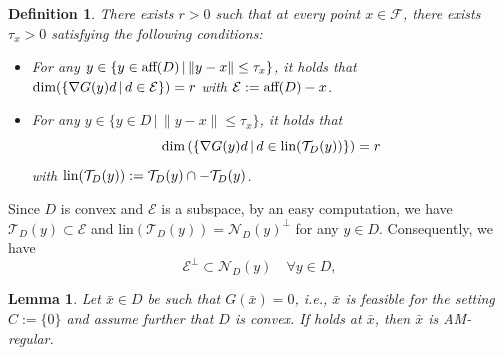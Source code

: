 \documentclass[10pt,a4paper]{amsart}
\newtheorem{definition}{Definition}
\newtheorem{lemma}{Lemma}
\begin{document}
\begin{definition}\label{Def:rCRCQ}
    There exists $r>0$ such that at every point $x\in \mathcal F$, there exists $\tau_x>0$ satisfying the following conditions:
    \begin{itemize}
        \item[(a)] For any $y\in \{y\in \text{\rm aff}(D) \,|\, \|y-x\|\leq \tau_x\}$, it holds that $\text{\rm dim}(\{\nabla G(y)d\,|\,d\in \mathcal E\})=r$ with $\mathcal E:=\text{\rm aff}(D)-x$.
        \item[(b)] For any $y\in \{y\in D \,|\, \|y-x\| \leq \tau_x\}$, it holds that
        \begin{equation*}
            \text{\rm dim}\left(\{\nabla G(y)d \,|\, d\in \text{\rm lin}(\mathcal T_D(y))\}\right) =r
        \end{equation*}
        with $\text{\rm lin}(\mathcal T_D(y)):=\mathcal T_D(y) \cap - \mathcal T_D(y)$.
    \end{itemize}
\end{definition}

Since $D$ is convex and $\mathcal E$ is a subspace, by an easy computation, we have $\mathcal T_D(y)\subset \mathcal E$ and $\text{lin}(\mathcal T_D(y))=\mathcal N_D(y)^{\perp}$ for any $y\in D$. Consequently, we have \begin{equation}\label{Eq:resultE}
\mathcal E^{\perp} \subset \mathcal N_D(y) \quad \forall y\in D,
\end{equation}

\begin{lemma}\label{Lem:weakCQ}
    Let $\bar x \in D$ be such that $G(\bar x)=0$, i.e., $\bar x$ is feasible for the setting $C:=\{0\}$ and assume further that $D$ is convex. If  holds at $\bar x$, then $\bar x$ is AM-regular.
\end{lemma}
\end{document}
